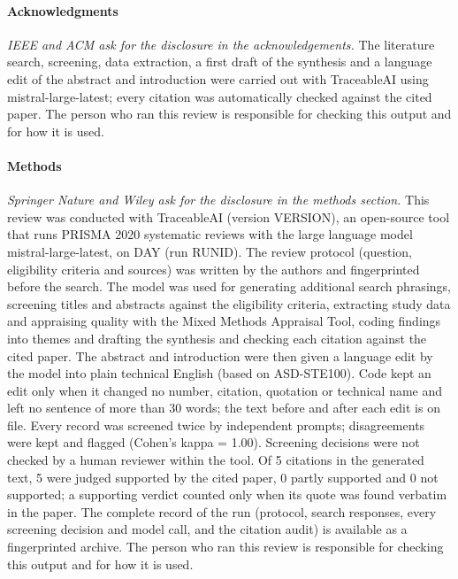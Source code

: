 \documentclass[10pt,a4paper]{article}
\begin{document}
\paragraph{Acknowledgments}
\textit{IEEE and ACM ask for the disclosure in the acknowledgements.} The literature search, screening, data extraction, a first draft of the synthesis and a language edit of the abstract and introduction were carried out with TraceableAI using mistral-large-latest; every citation was automatically checked against the cited paper. The person who ran this review is responsible for checking this output and for how it is used.\par
\paragraph{Methods}
\textit{Springer Nature and Wiley ask for the disclosure in the methods section.} This review was conducted with TraceableAI (version VERSION), an open-source tool that runs PRISMA 2020 systematic reviews with the large language model mistral-large-latest, on DAY (run RUNID). The review protocol (question, eligibility criteria and sources) was written by the authors and fingerprinted before the search. The model was used for generating additional search phrasings, screening titles and abstracts against the eligibility criteria, extracting study data and appraising quality with the Mixed Methods Appraisal Tool, coding findings into themes and drafting the synthesis and checking each citation against the cited paper. The abstract and introduction were then given a language edit by the model into plain technical English (based on ASD-STE100). Code kept an edit only when it changed no number, citation, quotation or technical name and left no sentence of more than 30 words; the text before and after each edit is on file. Every record was screened twice by independent prompts; disagreements were kept and flagged (Cohen's kappa = 1.00). Screening decisions were not checked by a human reviewer within the tool. Of 5 citations in the generated text, 5 were judged supported by the cited paper, 0 partly supported and 0 not supported; a supporting verdict counted only when its quote was found verbatim in the paper. The complete record of the run (protocol, search responses, every screening decision and model call, and the citation audit) is available as a fingerprinted archive. The person who ran this review is responsible for checking this output and for how it is used.\par
\end{document}
